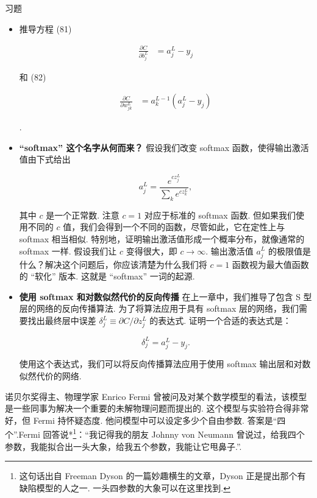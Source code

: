 \begin{exerciseBox}{习题}

\begin{itemize}

\item
推导方程 (81)

\begin{align*}
\frac{\partial C}{\partial b^L_j} &= a^L_j-y_j \nonumber
\end{align*}

和 (82)

\begin{align*}
\frac{\partial C}{\partial w^L_{jk}} &= a^{L-1}_k (a^L_j-y_j) \nonumber
\end{align*}

.

\item
\textbf{``softmax'' 这个名字从何而来？} 假设我们改变 softmax 函数，使得输出激活值由下式给出

\begin{equation}
a^L_j = \frac{e^{c z^L_j}}{\sum_k e^{c z^L_k}},
\tag{83}
\end{equation}

其中 $c$ 是一个正常数. 注意 $c = 1$ 对应于标准的 softmax 函数. 但如果我们使用不同的 $c$ 值，我们会得到一个不同的函数，尽管如此，它在定性上与 softmax 相当相似. 特别地，证明输出激活值形成一个概率分布，就像通常的 softmax 一样. 假设我们让 $c$ 变得很大，即 $c \rightarrow \infty$. 输出激活值 $a^L_j$ 的极限值是什么？解决这个问题后，你应该清楚为什么我们将 $c = 1$ 函数视为最大值函数的 ``软化'' 版本. 这就是 ``softmax'' 一词的起源.

\item
\textbf{使用 softmax 和对数似然代价的反向传播} 在上一章中，我们推导了包含 S 型层的网络的反向传播算法. 为了将算法应用于具有 softmax 层的网络，我们需要找出最终层中误差 $\delta^L_j \equiv \partial C / \partial z^L_j$ 的表达式. 证明一个合适的表达式是：

\begin{equation}
\delta^L_j = a^L_j -y_j.
\tag{84}
\end{equation}

使用这个表达式，我们可以将反向传播算法应用于使用 softmax 输出层和对数似然代价的网络.

\end{itemize}

\end{exerciseBox}

诺贝尔奖得主、物理学家 Enrico Fermi 曾被问及对某个数学模型的看法，该模型是一些同事为解决一个重要的未解物理问题而提出的. 这个模型与实验符合得非常好，但 Fermi 持怀疑态度. 他问模型中可以设定多少个自由参数. 答案是``四个''.Fermi 回答说*\footnote{这句话出自 Freeman Dyson 的一篇妙趣横生的文章，Dyson 正是提出那个有缺陷模型的人之一. 一头四参数的大象可以在这里找到.}：``我记得我的朋友 Johnny von Neumann 曾说过，给我四个参数，我能拟合出一头大象，给我五个参数，我能让它甩鼻子.''.

